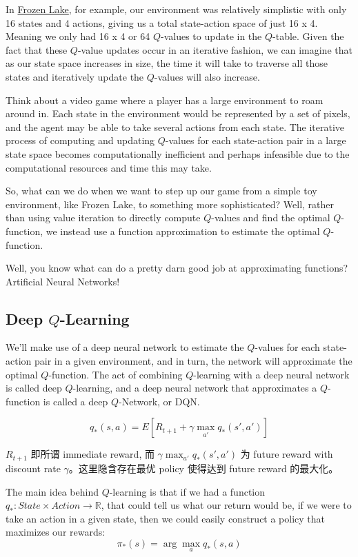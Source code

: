 In \href{https://deeplizard.com/learn/video/QK_PP_2KgGE}{Frozen Lake}, for example, our 
environment was relatively simplistic with only 16 states and 4 actions, giving us a 
total state-action space of just 16 x 4. Meaning we only had 16 x 4 or 64 $Q$-values to 
update in the $Q$-table. Given the fact that these $Q$-value updates occur in an iterative 
fashion, we can imagine that as our state space increases in size, the time it will take 
to traverse all those states and iteratively update the $Q$-values will also increase.

Think about a video game where a player has a large environment to roam around in. Each 
state in the environment would be represented by a set of pixels, and the agent may be 
able to take several actions from each state. The iterative process of computing and 
updating $Q$-values for each state-action pair in a large state space becomes 
computationally inefficient and perhaps infeasible due to the computational resources 
and time this may take.

So, what can we do when we want to step up our game from a simple toy environment, like 
Frozen Lake, to something more sophisticated? Well, rather than using value iteration to 
directly compute $Q$-values and find the optimal $Q$-function, we instead use a function 
approximation to estimate the optimal $Q$-function.

Well, you know what can do a pretty darn good job at approximating functions? Artificial 
Neural Networks!


\subsection{Deep $Q$-Learning}


We'll make use of a deep neural network to estimate the $Q$-values for each state-action 
pair in a given environment, and in turn, the network will approximate the optimal 
$Q$-function. The act of combining $Q$-learning with a deep neural network is called 
deep $Q$-learning, and a deep neural network that approximates a $Q$-function is called 
a deep $Q$-Network, or DQN.

\begin{equation}\label{eq:dqn_bellman_equation}
q_*(s,a) = E \left[ R_{t+1} + \gamma\max_{a'}q_*(s', a')
\right]
\end{equation}

\begin{emp_box}
$R_{t+1}$ 即所谓 immediate reward, 而 $\gamma\max_{a'}q_*(s', a')$ 为 future reward with 
discount rate $\gamma$。这里隐含存在最优 policy 使得达到 future reward 的最大化。

The main idea behind $Q$-learning is that if we had a function 
$q_*: State \times Action \rightarrow \mathbb{R}$, that could tell us what our return 
would be, if we were to take an action in a given state, then we could easily construct 
a policy that maximizes our rewards:
$$
\pi_*(s) = \arg\max_a q_*(s,a)
$$
\end{emp_box}

